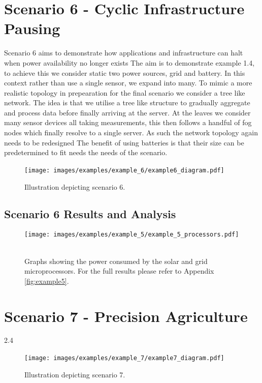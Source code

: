 \documentclass{l4proj}
\begin{document}
\section{Scenario 6 - Cyclic Infrastructure Pausing}\label{eval:subsec:scenario 6}
Scenario 6 aims to demonstrate how applications and infrastructure can halt when power availability no longer exists
The aim is to demonstrate example 1.4,
to achieve this we consider static two power sources, grid and battery.
In this context rather than use a single sensor, we expand into many.
To mimic a more realistic topology in prepearation for the final scenario we consider a tree like network.
The idea is that we utilise a tree like structure to gradually aggregate and process data before finally arriving at the server.
At the leaves we consider many sensor devices all taking measurements, this then follows a handful of fog nodes which finally resolve to a single server.
As such the network topology again needs to be redesigned
The benefit of using batteries is that their size can be predetermined to fit needs the needs of the scenario.
\begin{figure}[h]
    \centering
    \texttt{[image: images/examples/example\_6/example6\_diagram.pdf]}
    ~
    \caption{Illustration depicting scenario 6.}
    \label{fig:example6_diagram}
\end{figure}

\subsection{Scenario 6 Results and Analysis}
\begin{figure}[h]
    \centering
    \texttt{[image: images/examples/example\_5/example\_5\_processors.pdf]}
    ~
    \caption{Graphs showing the power consumed by the solar and grid microprocessors. For the full results please refer to Appendix \ref{fig:example5}.}
    \label{fig:example5_microprocessors}
\end{figure}

\section{Scenario 7 - Precision Agriculture}\label{eval:subsec:scenario 7}
2.4
\begin{figure}[h]
    \centering
    \texttt{[image: images/examples/example\_7/example7\_diagram.pdf]}
    ~
    \caption{Illustration depicting scenario 7.}
    \label{fig:example7_diagram}
\end{figure}
\end{document}

